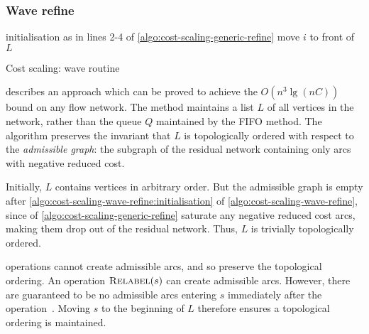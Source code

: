 \subsubsection{Wave refine} \label{sec:impl-cs-impl-wave}

\begin{algorithm}
\begin{algorithmic}[1]
    \State initialisation as in lines 2-4 of \label{algo:cost-scaling-wave-refine:initialisation} \cref{algo:cost-scaling-generic-refine}
     
    \Repeat
                \State {}
                    \State move $i$ to front of $L$
                \EndIf
            \EndIf
        \EndFor
    \EndFunction
\end{algorithmic}
\caption{Cost scaling: wave  routine}
\label{algo:cost-scaling-wave-refine}
\end{algorithm}

 describes an approach which can be proved to achieve the $O(n^3 \lg (nC))$ bound on any flow network. The method maintains a list $L$ of all vertices in the network, rather than the queue $Q$ maintained by the FIFO method. The algorithm preserves the invariant that $L$ is topologically ordered with respect to the \emph{admissible graph}: the subgraph of the residual network containing only arcs with negative reduced cost.

Initially, $L$ contains vertices in arbitrary order. But the admissible graph is empty after \cref{algo:cost-scaling-wave-refine:initialisation} of \cref{algo:cost-scaling-wave-refine}, since  of \cref{algo:cost-scaling-generic-refine} saturate any negative reduced cost arcs, making them drop out of the residual network. Thus, $L$ is trivially topologically ordered.

 operations cannot create admissible arcs, and so preserve the topological ordering. An operation $\textproc{Relabel}(s)$ can create admissible arcs. However, there are guaranteed to be no admissible arcs entering $s$ immediately after the operation~\cite[lemma~6.5]{Goldberg:1987}. Moving $s$ to the beginning of $L$ therefore ensures a topological ordering is maintained.\\

